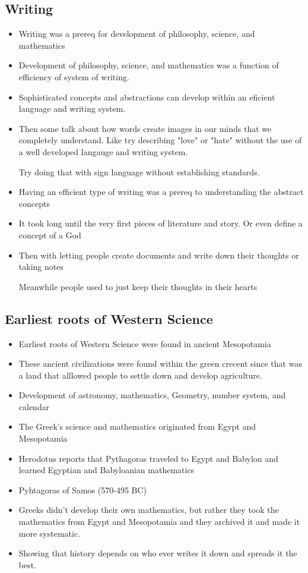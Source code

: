 \documentclass{article}
\begin{document}
\subsection{Writing}
\begin{itemize}
  \item Writing was a prereq for development of philosophy, science, and mathematics
  \item Development of philosophy, science, and mathematics
    was a function of efficiency of system of writing.
  \item Sophisticated concepts and abstractions can develop within
    an eficient language and writing system.
  \item Then some talk about how words create images in our minds
    that we completely understand. Like try describing
    "love" or "hate" without the use of a well developed langauge
    and writing system.

    Try doing that with sign language without establishing standards.
  \item Having an efficient type of writing was a prereq to understanding
    the abstract concepts
  \item It took long until the very first pieces of literature and
    story. Or even define a concept of a God
  \item Then with letting people create documents and write
    down their thoughts or taking notes

    Meanwhile people used to just keep their thoughts in their hearts
\end{itemize}

\subsection{Earliest roots of Western Science}
\begin{itemize}
  \item Earliest roots of Western Science were found in ancient Mesopotamia
  \item These ancient civilizations were found within the green crecent
    since that was a land that alllowed people to settle down
    and develop agriculture.
  \item Development of astronomy, mathematics, Geometry, number system, and calendar
  \item The Greek's science and mathematics originated from Egypt and Mesopotamia
  \item Herodotus reports that Pythagoras traveled to Egypt and Babylon and learned Egyptian and Babyloanian mathematics
  \item Pyhtagoras of Samos (570-495 BC)
  \item Greeks didn't develop their own mathematics, but rather
    they took the mathematics from Egypt and Mesopotamia
    and they archived it and made it more systematic.
  \item Showing that history depends on who ever writes it down
    and spreads it the best.
\end{itemize}
\end{document}
